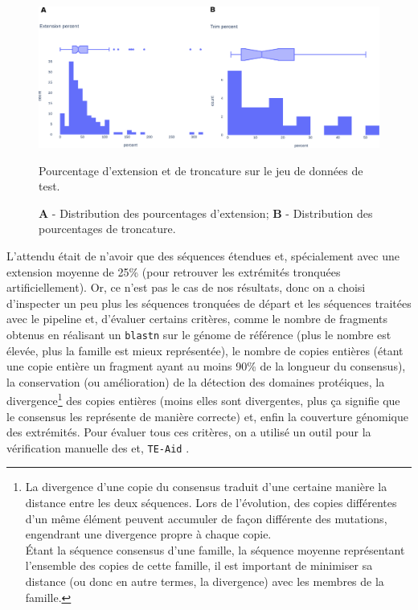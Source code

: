 \documentclass[10pt]{article}
\begin{document}
\begin{figure}[h]
    \centering
    \includegraphics[width=\textwidth]{img/plots/droso_polish.eps}
    \caption{Pourcentage d'extension et de troncature sur le jeu de données de test.}
    \caption*{
    \scriptsize{
    \textbf{A} - Distribution des pourcentages d'extension; \textbf{B} - Distribution des pourcentages de troncature.
    }
    }
    \label{fig:droso_polish_stats}
\end{figure}


L'attendu était de n'avoir que des séquences étendues et, spécialement avec une extension moyenne de 25\% (pour retrouver les extrémités tronquées artificiellement). Or, ce n'est pas le cas de nos résultats, donc on a choisi d'inspecter un peu plus les séquences tronquées de départ et les séquences traitées avec le pipeline et, d'évaluer certains critères, comme le nombre de fragments obtenus en réalisant un \texttt{blastn} sur le génome de référence (plus le nombre est élevée, plus la famille est mieux représentée), le nombre de copies entières (étant une copie entière un fragment ayant au moins 90\% de la longueur du consensus), la conservation (ou amélioration) de la détection des domaines protéiques, la divergence\footnote{
La divergence d'une copie du consensus traduit d'une certaine manière la distance entre les deux séquences. Lors de l'évolution, des copies différentes d'un même élément peuvent accumuler de façon différente des mutations, engendrant une divergence propre à chaque copie. \\
\'Etant la séquence consensus d'une famille, la séquence \og moyenne \fg{} représentant l'ensemble des copies de cette famille, il est important de minimiser sa distance (ou donc en autre termes, la divergence) avec les membres de la famille.
} 
des copies entières (moins elles sont divergentes, plus ça signifie que le consensus les représente de manière correcte) et, enfin la couverture génomique des extrémités. Pour évaluer tous ces critères, on a utilisé un outil pour la vérification manuelle des \acrshort{et}, \texttt{TE-Aid} \cite{goubert_beginners_2022}. \\
\end{document}
